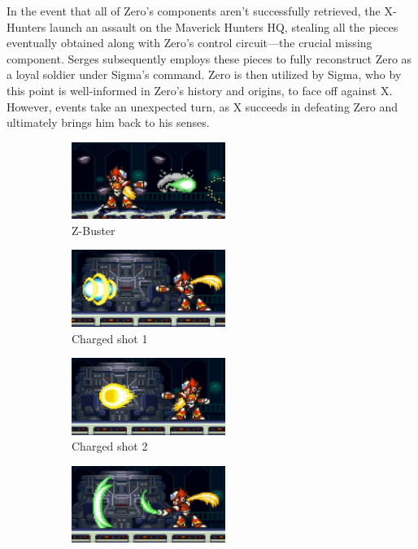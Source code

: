 In the event that all of Zero's components aren't successfully retrieved, the X-Hunters launch an assault on the Maverick Hunters HQ, stealing all the pieces eventually obtained along with Zero's control circuit—the crucial missing component. Serges subsequently employs these pieces to fully reconstruct Zero as a loyal soldier under Sigma's command. Zero is then utilized by Sigma, who by this point is well-informed in Zero's history and origins, to face off against X. However, events take an unexpected turn, as X succeeds in defeating Zero and ultimately brings him back to his senses.
\begin{figure}[htp]
	\centering
	\begin{subfigure}{0.45\linewidth}
		\centering
		\includegraphics[height=2.5cm]{figures/X2/Hunter_stages/Zero_shot.png}
		\caption{Z-Buster}	
	\end{subfigure}
	\begin{subfigure}{0.45\linewidth}
		\centering
		\includegraphics[height=2.5cm]{figures/X2/Hunter_stages/Zero_combo_1.png}
		\caption{Charged shot 1}
	\end{subfigure}
	\begin{subfigure}{0.45\linewidth}
		\centering
		\includegraphics[height=2.5cm]{figures/X2/Hunter_stages/Zero_combo_2.png}
		\caption{Charged shot 2}
	\end{subfigure}
	\begin{subfigure}{0.45\linewidth}
		\centering
		\includegraphics[height=2.5cm]{figures/X2/Hunter_stages/Zero_combo_3.png}

\end{subfigure}
\end{figure}
